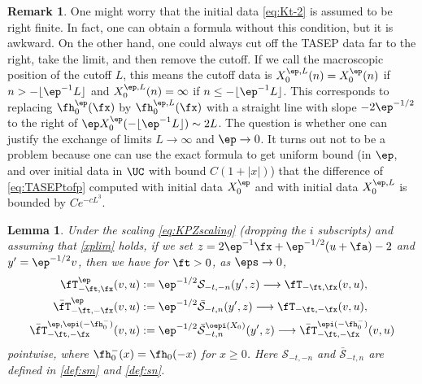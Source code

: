 \documentclass[]{pcmi}
\theoremstyle{plain}
\newtheorem{lemma}[equation]{Lemma}
\theoremstyle{definition}
\newtheorem{remark}[equation]{Remark}
\renewcommand{\SM}{\mathcal{S}}
\renewcommand{\SN}{\bar{\mathcal{S}}}
\begin{document}
\begin{remark} One might worry that the initial data  \eqref{eq:Kt-2} is assumed to be right finite.  In fact, one can obtain a formula without this condition,
but it is awkward.  On the other hand, one could always cut off the TASEP data far to the right, take the limit, and then remove the cutoff.
If we call the macroscopic position of the cutoff $L$, this means 
 the cutoff data is $X_0^{\ep,L}(n) = X^\ep_0(n)$ if 
$n  > -\lfloor\ep^{-1}L\rfloor$  and $X_0^{\ep,L}(n) = \infty$ if $n\le -\lfloor\ep^{-1}L\rfloor$.  This corresponds to replacing $\fh^{\ep}_0(\fx)$ by $\fh^{\ep,L}_0(\fx)$ with a straight line with slope $-2\ep^{-1/2}$ to the right of $\ep X^\ep_0(-\lfloor\ep^{-1}L\rfloor)\sim 2L$.    The question is 
whether one can justify the exchange of limits $L\to\infty$ and $\ep\to 0$.  It turns out not to be a problem because one can use the exact formula
to get uniform bound (in $\ep$, and over initial data in $\UC$ with bound $C(1+|x|)$) that the difference of \eqref{eq:TASEPtofp} computed with initial data $X^\ep_0$ and with initial data $X_0^{\ep,L}$ is bounded by $ C e^{-cL^3}$. 
\end{remark}

\begin{lemma}\label{lem:KernelLimit1}
Under the scaling \eqref{eq:KPZscaling} (dropping the $i$ subscripts) and assuming that \eqref{xplim} holds, if we set $z=2\ep^{-1}\fx+\ep^{-1/2}(u+\fa)-2$ and  $y'=\ep^{-1/2}v$, then we have for $\ft>0$, as $\eps \to 0$,
\begin{align}\label{eq:QRcvgce}
\fT^\ep_{-\ft,\fx}(v,u)&:=\ep^{-1/2}\SM_{-t,-n}(y',z)\longrightarrow{} \fT_{-\ft,\fx}(v,u),\\\label{eq:QRcvgce2}
\bar\fT^\ep_{-\ft,-\fx}(v,u)&:=\ep^{-1/2}\SN_{-t,n}(y',z)\longrightarrow {} \fT_{-\ft,-\fx}(v,u),\\\label{eq:QRcvgce3}
\bar{\fT}^{\ep,\epi(-\fh_0^-)}_{-\ft,-\fx}(v,u)&:=\ep^{-1/2} {\SN}^{\oepi(X_0)}_{-t,n}(y',z)\longrightarrow {} \bar{\fT}^{\epi(-\fh_0^-)}_{-\ft,-\fx}(v,u)
\end{align} 
pointwise, where $\fh_0^-(x)=\fh_0(-x)$ for $x\geq0$.  Here $\SM_{-t,-n}$ and $\SN_{-t,n}$ are defined in \eqref{def:sm} and \eqref{def:sn}. 
\end{lemma}
\end{document}
